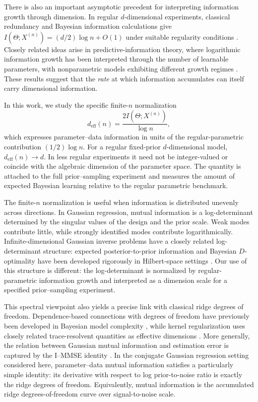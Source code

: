 \documentclass[11pt]{article}
\theoremstyle{plain}
\theoremstyle{definition}
\theoremstyle{remark}
\begin{document}
There is also an important asymptotic precedent for interpreting information growth through dimension. In regular \(d\)-dimensional experiments, classical redundancy and Bayesian information calculations give \(I(\Theta;X^{(n)})=(d/2)\log n+O(1)\) under suitable regularity conditions \citep{clarke1990information}. Closely related ideas arise in predictive-information theory, where logarithmic information growth has been interpreted through the number of learnable parameters, with nonparametric models exhibiting different growth regimes \citep{bialek2001predictability}. These results suggest that the \emph{rate} at which information accumulates can itself carry dimensional information.

In this work, we study the specific finite-\(n\) normalization
\[
d_{\mathrm{eff}}(n)
=
\frac{2I(\Theta;X^{(n)})}{\log n},
\]
which expresses parameter--data information in units of the regular-parametric contribution \((1/2)\log n\). For a regular fixed-prior \(d\)-dimensional model, \(d_{\mathrm{eff}}(n)\to d\). In less regular experiments it need not be integer-valued or coincide with the algebraic dimension of the parameter space. The quantity is attached to the full prior--sampling experiment and measures the amount of expected Bayesian learning relative to the regular parametric benchmark.

The finite-\(n\) normalization is useful when information is distributed unevenly across directions. In Gaussian regression, mutual information is a log-determinant determined by the singular values of the design and the prior scale. Weak modes contribute little, while strongly identified modes contribute logarithmically. Infinite-dimensional Gaussian inverse problems have a closely related log-determinant structure: expected posterior-to-prior information and Bayesian \(D\)-optimality have been developed rigorously in Hilbert-space settings \citep{alexanderian2016bayesian}. Our use of this structure is different: the log-determinant is normalized by regular-parametric information growth and interpreted as a dimension scale for a specified prior--sampling experiment.

This spectral viewpoint also yields a precise link with classical ridge degrees of freedom. Dependence-based connections with degrees of freedom have previously been developed in Bayesian model complexity \citep{van2012bayesian}, while kernel regularization uses closely related trace-resolvent quantities as effective dimensions \citep{caponnetto2007optimal}. More generally, the relation between Gaussian mutual information and estimation error is captured by the I--MMSE identity \citep{guo2005mutual}. In the conjugate Gaussian regression setting considered here, parameter--data mutual information satisfies a particularly simple identity: its derivative with respect to log prior-to-noise ratio is exactly the ridge degrees of freedom. Equivalently, mutual information is the accumulated ridge degrees-of-freedom curve over signal-to-noise scale.
\end{document}
